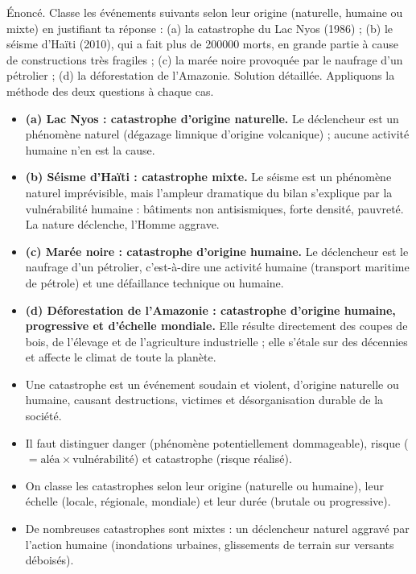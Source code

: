 \documentclass[11pt]{article}
\newcommand{\cle}[1]{{\popxbold\color{popdark}#1}}
\begin{document}
\begin{exoresolu}
Énoncé. Classe les événements suivants selon leur origine (naturelle, humaine ou mixte) en justifiant ta réponse : (a) la catastrophe du Lac Nyos (1986) ; (b) le séisme d'Haïti (2010), qui a fait plus de \num{200000} morts, en grande partie à cause de constructions très fragiles ; (c) la marée noire provoquée par le naufrage d'un pétrolier ; (d) la déforestation de l'Amazonie.
\tcblower
Solution détaillée. Appliquons la méthode des deux questions à chaque cas.
\begin{itemize}
\item \textbf{(a) Lac Nyos : catastrophe d'origine naturelle.} Le déclencheur est un phénomène naturel (dégazage limnique d'origine volcanique) ; aucune activité humaine n'en est la cause.
\item \textbf{(b) Séisme d'Haïti : catastrophe mixte.} Le séisme est un phénomène naturel imprévisible, mais l'ampleur dramatique du bilan s'explique par la vulnérabilité humaine : bâtiments non antisismiques, forte densité, pauvreté. La nature déclenche, l'Homme aggrave.
\item \textbf{(c) Marée noire : catastrophe d'origine humaine.} Le déclencheur est le naufrage d'un pétrolier, c'est-à-dire une activité humaine (transport maritime de pétrole) et une défaillance technique ou humaine.
\item \textbf{(d) Déforestation de l'Amazonie : catastrophe d'origine humaine, progressive et d'échelle mondiale.} Elle résulte directement des coupes de bois, de l'élevage et de l'agriculture industrielle ; elle s'étale sur des décennies et affecte le climat de toute la planète.
\end{itemize}
\end{exoresolu}

\begin{aretenir}
\begin{itemize}
\item Une \cle{catastrophe} est un événement soudain et violent, d'origine naturelle ou humaine, causant destructions, victimes et désorganisation durable de la société.
\item Il faut distinguer \cle{danger} (phénomène potentiellement dommageable), \cle{risque} ($= \text{aléa} \times \text{vulnérabilité}$) et \cle{catastrophe} (risque réalisé).
\item On classe les catastrophes selon leur \cle{origine} (naturelle ou humaine), leur \cle{échelle} (locale, régionale, mondiale) et leur \cle{durée} (brutale ou progressive).
\item De nombreuses catastrophes sont \cle{mixtes} : un déclencheur naturel aggravé par l'action humaine (inondations urbaines, glissements de terrain sur versants déboisés).
\end{itemize}
\end{aretenir}
\end{document}
